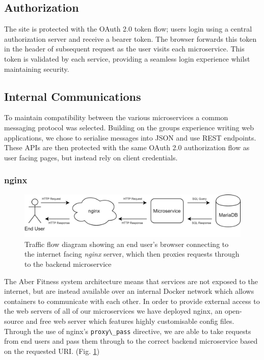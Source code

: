 \subsection{Authorization}
    \par
    The site is protected with the OAuth 2.0 token flow; users login using a central authorization server and receive a bearer token. The browser forwards this token in the header of subsequent request as the user visits each microservice. This token is validated by each service, providing a seamless login experience whilst maintaining security.

\subsection{Internal Communications}
    \par
    To maintain compatibility between the various microservices a common messaging protocol was selected. Building on the groups experience writing web applications, we chose to serialise messages into JSON and use REST endpoints. These APIs are then protected with the same OAuth 2.0 authorization flow as user facing pages, but instead rely on client credentials.

\subsubsection{nginx}
    \begin{figure}[H]
        \centering
        \includegraphics[width=\textwidth]{Images/nginx_proxy_flow.png}
        \caption{Traffic flow diagram showing an end user's browser connecting to the internet facing \textit{nginx} server, which then proxies requests through to the backend microservice}
        \label{fig:nginx_proxy_flow}
    \end{figure}
    
    The Aber Fitness system architecture means that services are not exposed to the internet, but are instead available over an internal Docker network which allows containers to communicate with each other. In order to provide external access to the web servers of all of our microservices we have deployed nginx, an open-source and free web server which features highly customisable config files. Through the use of nginx's \lstinline{proxy\_pass} directive, we are able to take requests from end users and pass them through to the correct backend microservice based on the requested URI. (Fig. \ref{fig:nginx_proxy_flow})
    

